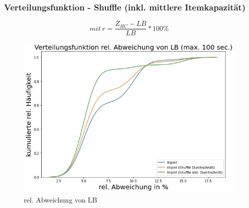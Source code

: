 \documentclass{beamer}
\begin{document}
\begin{frame}

\frametitle{Verteilungsfunktion - Shuffle (inkl. mittlere Itemkapazität)}

\begin{footnotesize}
\begin{equation}
mit \ r = \frac{Z_{HC}-LB}{LB} * 100\%
\end{equation}
\end{footnotesize}

\begin{figure}[!htbp]
\begin{center}
\includegraphics[scale=0.3]{img/dist_trip3.png}
\end{center}
\caption{rel. Abweichung von LB}
\label{fig:architecture}
\end{figure}



\end{frame}
\end{document}
